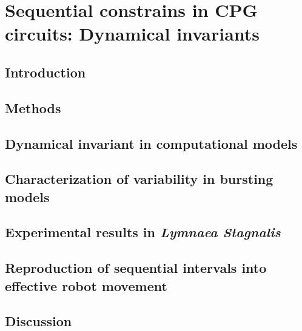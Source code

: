 \chapter{Sequential constrains in CPG circuits: Dynamical invariants}
\label{c-invariants}
\section{Introduction}

\section{Methods}

\section{Dynamical invariant in computational models}

\section{Characterization of variability in bursting models}
\label{c-invariants-model}
\section{Experimental results in \textit{Lymnaea Stagnalis}}

\section{Reproduction of sequential intervals into effective robot movement}

\section{Discussion}
